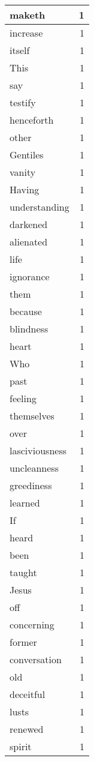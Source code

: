 \begin{center}
\begin{longtable}{l|r}
maketh & 1\\ \hline 
increase & 1\\ \hline 
itself & 1\\ \hline 
This & 1\\ \hline 
say & 1\\ \hline 
testify & 1\\ \hline 
henceforth & 1\\ \hline 
other & 1\\ \hline 
Gentiles & 1\\ \hline 
vanity & 1\\ \hline 
Having & 1\\ \hline 
understanding & 1\\ \hline 
darkened & 1\\ \hline 
alienated & 1\\ \hline 
life & 1\\ \hline 
ignorance & 1\\ \hline 
them & 1\\ \hline 
because & 1\\ \hline 
blindness & 1\\ \hline 
heart & 1\\ \hline 
Who & 1\\ \hline 
past & 1\\ \hline 
feeling & 1\\ \hline 
themselves & 1\\ \hline 
over & 1\\ \hline 
lasciviousness & 1\\ \hline 
uncleanness & 1\\ \hline 
greediness & 1\\ \hline 
learned & 1\\ \hline 
If & 1\\ \hline 
heard & 1\\ \hline 
been & 1\\ \hline 
taught & 1\\ \hline 
Jesus & 1\\ \hline 
off & 1\\ \hline 
concerning & 1\\ \hline 
former & 1\\ \hline 
conversation & 1\\ \hline 
old & 1\\ \hline 
deceitful & 1\\ \hline 
lusts & 1\\ \hline 
renewed & 1\\ \hline 
spirit & 1\\ \hline 

\end{longtable}
\end{center}
